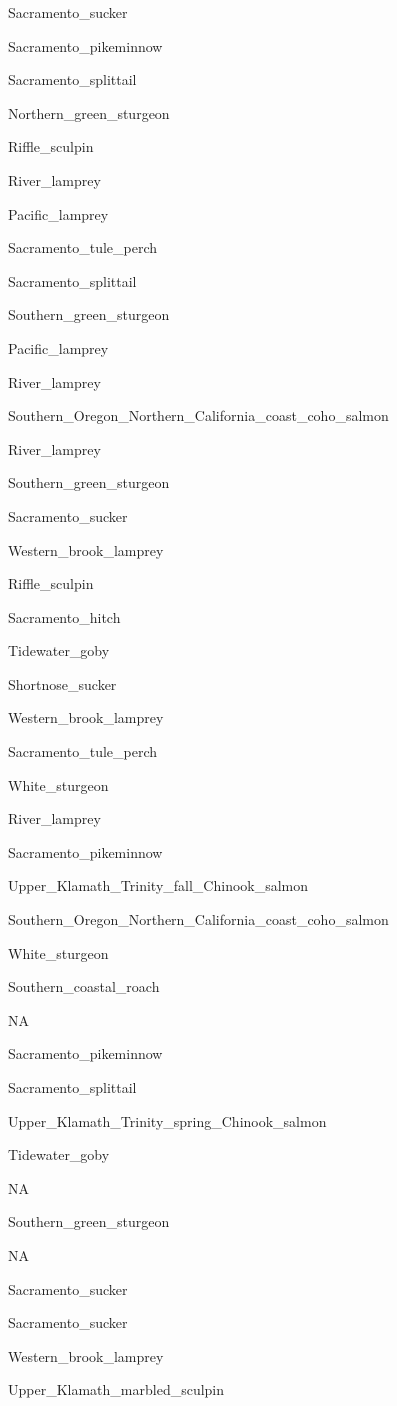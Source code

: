 \documentclass[]{article}
\begin{document}
Sacramento\_sucker

Sacramento\_pikeminnow

Sacramento\_splittail

Northern\_green\_sturgeon

Riffle\_sculpin

River\_lamprey

Pacific\_lamprey

Sacramento\_tule\_perch

Sacramento\_splittail

Southern\_green\_sturgeon

Pacific\_lamprey

River\_lamprey

Southern\_Oregon\_Northern\_California\_coast\_coho\_salmon

River\_lamprey

Southern\_green\_sturgeon

Sacramento\_sucker

Western\_brook\_lamprey

Riffle\_sculpin

Sacramento\_hitch

Tidewater\_goby

Shortnose\_sucker

Western\_brook\_lamprey

Sacramento\_tule\_perch

White\_sturgeon

River\_lamprey

Sacramento\_pikeminnow

Upper\_Klamath\_Trinity\_fall\_Chinook\_salmon

Southern\_Oregon\_Northern\_California\_coast\_coho\_salmon

White\_sturgeon

Southern\_coastal\_roach

NA

Sacramento\_pikeminnow

Sacramento\_splittail

Upper\_Klamath\_Trinity\_spring\_Chinook\_salmon

Tidewater\_goby

NA

Southern\_green\_sturgeon

NA

Sacramento\_sucker

Sacramento\_sucker

Western\_brook\_lamprey

Upper\_Klamath\_marbled\_sculpin
\end{document}
